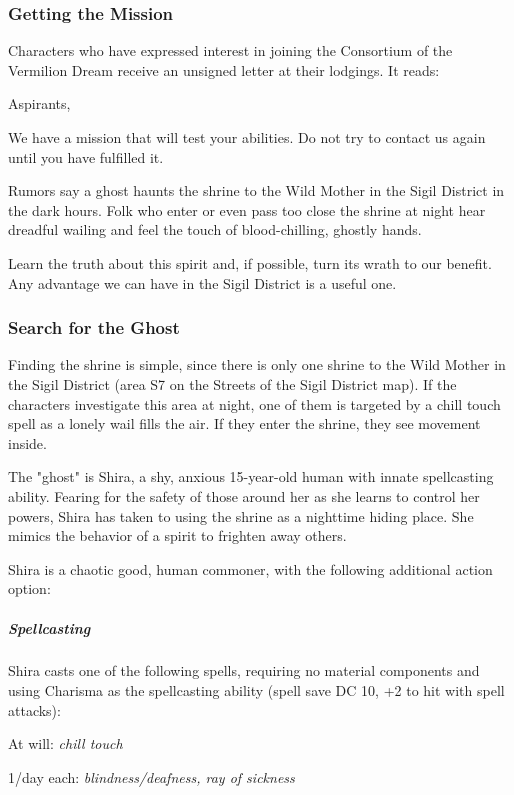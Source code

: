 \documentclass[10pt,a4paper,twoside,bg=print,twocolumn,openany,nodeprecatedcode]{dndbook}
\begin{document}
\subsubsection{Getting the Mission}
Characters who have expressed interest in joining the Consortium of the Vermilion Dream receive an unsigned letter at their lodgings. It reads:

\begin{DndReadAloud}{}
Aspirants,

We have a mission that will test your abilities. Do not try to contact us again until you have fulfilled it.

Rumors say a ghost haunts the shrine to the Wild Mother in the Sigil District in the dark hours. Folk who enter or even pass too close the shrine at night hear dreadful wailing and feel the touch of blood-chilling, ghostly hands.

Learn the truth about this spirit and, if possible, turn its wrath to our benefit. Any advantage we can have in the Sigil District is a useful one.

\end{DndReadAloud}

\subsubsection{Search for the Ghost}
Finding the shrine is simple, since there is only one shrine to the Wild Mother in the Sigil District (area S7 on the Streets of the Sigil District map). If the characters investigate this area at night, one of them is targeted by a chill touch spell as a lonely wail fills the air. If they enter the shrine, they see movement inside.

The "ghost" is Shira, a shy, anxious 15-year-old human with innate spellcasting ability. Fearing for the safety of those around her as she learns to control her powers, Shira has taken to using the shrine as a nighttime hiding place. She mimics the behavior of a spirit to frighten away others.

Shira is a chaotic good, human commoner, with the following additional action option:

\begin{DndComment}{}
\subparagraph{Spellcasting}
Shira casts one of the following spells, requiring no material components and using Charisma as the spellcasting ability (spell save DC 10, +2 to hit with spell attacks):

At will: \textit{chill touch}

1/day each: \textit{blindness/deafness, ray of sickness}

\end{DndComment}
\end{document}
